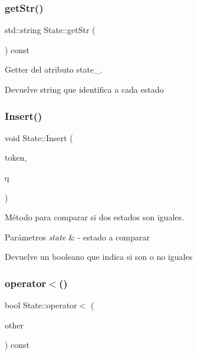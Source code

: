\subsubsection{\texorpdfstring{get\+Str()}{getStr()}}
{\footnotesize\ttfamily std\+::string State\+::get\+Str (\begin{DoxyParamCaption}{ }\end{DoxyParamCaption}) const}



Getter del atributo state\+\_\+. 

\begin{DoxyReturn}{Devuelve}
string que identifica a cada estado 
\end{DoxyReturn}
\mbox{\label{classState_a890e208099230b4ff3b6bafe215d94d6}} 
\subsubsection{\texorpdfstring{Insert()}{Insert()}}
{\footnotesize\ttfamily void State\+::\+Insert (\begin{DoxyParamCaption}\item[{char}]{token,  }\item[{\hyperlink{classState}{State}}]{q }\end{DoxyParamCaption})}



Método para comparar si dos estados son iguales. 


\begin{DoxyParams}{Parámetros}
{\em state} & -\/ estado a comparar \\
\hline
\end{DoxyParams}
\begin{DoxyReturn}{Devuelve}
un booleano que indica si son o no iguales 
\end{DoxyReturn}
\mbox{\label{classState_a04827418cf8fd791b7f7e7f9a1f23a55}} 
\subsubsection{\texorpdfstring{operator$<$()}{operator<()}}
{\footnotesize\ttfamily bool State\+::operator$<$ (\begin{DoxyParamCaption}\item[{const \hyperlink{classState}{State} \&}]{other }\end{DoxyParamCaption}) const}




